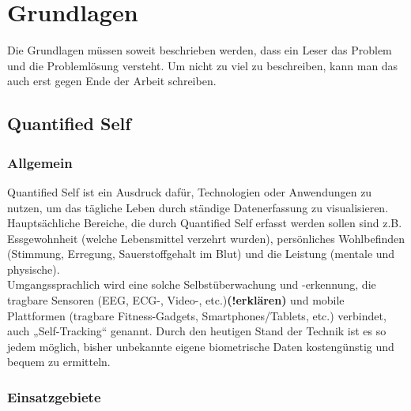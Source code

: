 
\chapter{Grundlagen}
\label{ch:Grundlagen}
Die Grundlagen müssen soweit beschrieben werden, dass ein Leser das Problem und die Problemlösung versteht.
Um nicht zu viel zu beschreiben, kann man das auch erst gegen Ende der Arbeit schreiben.


\section{Quantified Self}
\label{ch:Grundlagen:sec:QuantifiedSelf}

\subsection{Allgemein}
\label{ch:Grundlagen:sec:QuantifiedSelf:subsec:Allgemein}

Quantified Self ist ein Ausdruck dafür, Technologien oder Anwendungen zu nutzen, um das tägliche Leben durch ständige Datenerfassung zu visualisieren. 
Hauptsächliche Bereiche, die durch Quantified Self erfasst werden sollen sind z.B. Essgewohnheit (welche Lebensmittel verzehrt wurden), persönliches Wohlbefinden (Stimmung, Erregung, Sauerstoffgehalt im Blut) und die Leistung (mentale und physische). \cite{web:WhatIsQS}\\
Umgangssprachlich wird eine solche Selbstüberwachung und -erkennung, die tragbare Sensoren (EEG, ECG-, Video-, etc.)\textbf{(!erklären)} und mobile Plattformen (tragbare Fitness-Gadgets, Smartphones/Tablets, etc.) verbindet, auch „Self-Tracking“ genannt. 
Durch den heutigen Stand der Technik ist es so jedem möglich, bisher unbekannte eigene biometrische Daten kostengünstig und bequem zu ermitteln.

\subsection{Einsatzgebiete}
\label{ch:Grundlagen:sec:QuantifiedSelf:subsec:Einsatzgebiete}

